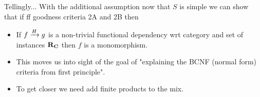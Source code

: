 \begin{frame}{Tellingly...}
With the additional assumption now that $S$ is simple we can show that if
ff goodness criteria 2A and 2B then 
\begin{itemize}
\item If $\fundep{H}{f}{g}$ is a non-trivial   functional dependency wrt  category \catcw and set of instances $\reqtc$
 then $f$ is a monomorphism.

\item This moves us into sight of the goal of "explaining the BCNF (normal form) criteria from first principle". 

\item To get closer we need add finite products to the mix.
\end{itemize}
\end{frame}
